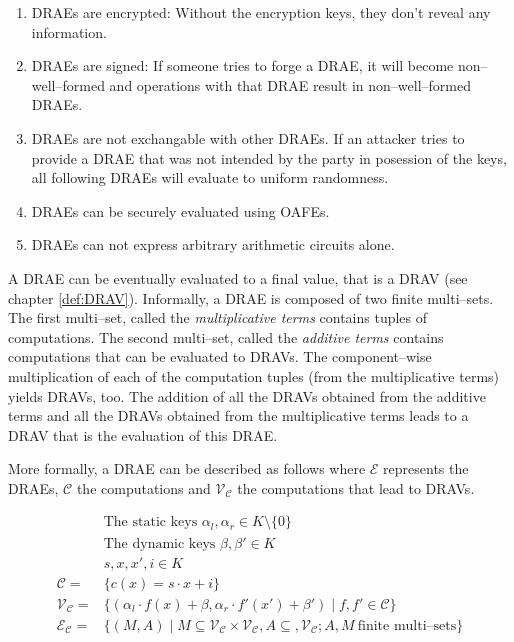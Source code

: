 \begin{enumerate}

  \item \label{prop:drae-encrypted} DRAEs are encrypted: Without the encryption
    keys, they don't reveal any information.

  \item \label{prop:drae-signed} DRAEs are signed: If someone tries to forge a
    DRAE, it will become non--well--formed and operations with that DRAE result
    in non--well--formed DRAEs.

  \item DRAEs are not exchangable with other DRAEs. If an attacker tries to
    provide a DRAE that was not intended by the party in posession of the keys,
    all following DRAEs will evaluate to uniform randomness.

  \item \label{prop:drae-oafe} DRAEs can be securely evaluated using OAFEs.

  \item \label{prop:drae-not-enough} DRAEs can not express arbitrary arithmetic
    circuits alone.

\end{enumerate}

\noindent{}A DRAE can be eventually evaluated to a final value, that is a DRAV
(see chapter \ref{def:DRAV}). Informally, a DRAE is composed of two finite
multi--sets. The first multi--set, called the \emph{multiplicative terms}
contains tuples of computations. The second multi--set, called the
\emph{additive terms} contains computations that can be evaluated to DRAVs. The
component--wise multiplication of each of the computation tuples (from the
multiplicative terms) yields DRAVs, too. The addition of all the DRAVs obtained
from the additive terms and all the DRAVs obtained from the multiplicative terms
leads to a DRAV that is the evaluation of this DRAE.

More formally, a DRAE can be described as follows where $\mathcal{E}$ represents
the DRAEs, $\mathcal{C}$ the computations and $\mathcal{V}_\mathcal{C}$ the
computations that lead to DRAVs.

\begin{align}
%
  &\text{The static keys } \alpha_l, \alpha_r \in K \setminus \{0\} \nonumber\\
%
  &\text{The dynamic keys } \beta, \beta' \in K \nonumber\\
%
  &s, x, x', i \in K \nonumber\\
%
  \mathcal{C} = & \{ c(x) = s \cdot x + i \} \nonumber\\
%
  \mathcal{V}_\mathcal{C} = & \{ (\alpha_l \cdot f(x) + \beta,
                      \alpha_r \cdot f'(x') + \beta' )
                    \mid f, f' \in \mathcal{C} \} \nonumber\\
%
  \label{rel:DRAE}
  \mathcal{E}_\mathcal{C} = & \{ (M, A) \mid
      M \subseteq \mathcal{V}_\mathcal{C} \times
      \mathcal{V}_\mathcal{C}, A \subseteq, \mathcal{V}_\mathcal{C};
  A, M~\text{finite multi--sets} \}
%
\end{align}

